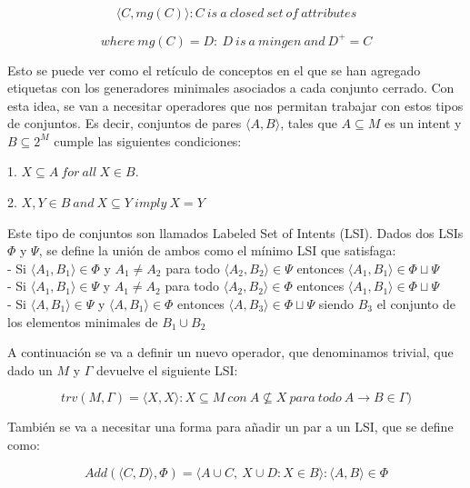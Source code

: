     \[
        {\langle C, mg(C) \rangle : C ~ is ~ a ~ closed ~ set ~ of ~ attributes}    
    \]

    \[
        where ~ mg(C) = {D: ~ D ~ is ~ a ~ mingen ~ and ~ D^+ = C}    
    \]

    Esto se puede ver como el ret\'iculo de conceptos en el que se han agregado etiquetas con los generadores minimales asociados a cada conjunto cerrado.
    Con esta idea, se van a necesitar operadores que nos permitan trabajar con estos tipos de conjuntos. Es decir, conjuntos de pares 
    \( \langle A, B \rangle \), tales que \( A \subseteq M\) es un intent y \( B \subseteq 2^M\) cumple las siguientes condiciones:

    1. \(X \subseteq A ~ for ~ all ~ X \in B\).

    2. \(X,Y \in B ~ and ~ X \subseteq Y ~ imply ~ X = Y\)

    Este tipo de conjuntos son llamados Labeled Set of Intents (LSI). Dados dos LSIs \(\Phi\) y \(\Psi\), se define la uni\'on de ambos como 
    el m\'inimo LSI que satisfaga:
    \\
    - Si \( \langle A_{1}, B_{1} \rangle \in \Phi \) y \(A_{1} \neq A_{2} \) para todo \( \langle A_{2}, B_{2} \rangle \in \Psi \) 
    entonces \( \langle A_{1}, B_{1} \rangle \in \Phi \sqcup \Psi \)
    \\
    - Si \( \langle A_{1}, B_{1} \rangle \in \Psi \) y \(A_{1} \neq A_{2} \) para todo \( \langle A_{2}, B_{2} \rangle \in \Phi \) 
    entonces \( \langle A_{1}, B_{1} \rangle \in \Phi \sqcup \Psi \)
    \\
    - Si \( \langle A, B_{1} \rangle \in \Psi \) y \( \langle A, B_{1} \rangle \in \Phi \) entonces \( \langle A, B_{3} \rangle \in \Phi \sqcup \Psi \) 
    siendo \(B_{3}\) el conjunto de los elementos minimales de \(B_{1} \cup B_{2}\)

    
    A continuaci\'on se va a definir un nuevo operador, que denominamos trivial, que dado un \(M\) y \(\Gamma\) devuelve el siguiente LSI:


    \[
        trv(M, \Gamma) = {\langle X, {X} \rangle: X \subseteq M ~ con ~ A \not \subseteq X ~ para ~ todo ~ A \rightarrow B \in \Gamma} )    
    \]

    Tambi\'en se va a necesitar una forma para a\~nadir un par a un LSI, que se define como:

    \[
        Add(\langle C, {D} \rangle, \Phi) = {\langle A \cup C, ~ {X \cup D: X \in B} \rangle : \langle A, B\rangle \in \Phi}    
    \]


